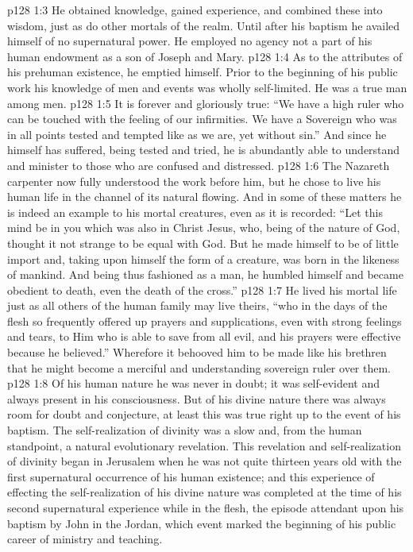 \vs p128 1:3 He obtained knowledge, gained experience, and combined these into wisdom, just as do other mortals of the realm. Until after his baptism he availed himself of no supernatural power. He employed no agency not a part of his human endowment as a son of Joseph and Mary.
\vs p128 1:4 As to the attributes of his prehuman existence, he emptied himself. Prior to the beginning of his public work his knowledge of men and events was wholly self\hyp{}limited. He was a true man among men.
\pc \vs p128 1:5 It is forever and gloriously true: “We have a high ruler who can be touched with the feeling of our infirmities. We have a Sovereign who was in all points tested and tempted like as we are, yet without sin.” And since he himself has suffered, being tested and tried, he is abundantly able to understand and minister to those who are confused and distressed.
\pc \vs p128 1:6 The Nazareth carpenter now fully understood the work before him, but he chose to live his human life in the channel of its natural flowing. And in some of these matters he is indeed an example to his mortal creatures, even as it is recorded: “Let this mind be in you which was also in Christ Jesus, who, being of the nature of God, thought it not strange to be equal with God. But he made himself to be of little import and, taking upon himself the form of a creature, was born in the likeness of mankind. And being thus fashioned as a man, he humbled himself and became obedient to death, even the death of the cross.”
\vs p128 1:7 He lived his mortal life just as all others of the human family may live theirs, “who in the days of the flesh so frequently offered up prayers and supplications, even with strong feelings and tears, to Him who is able to save from all evil, and his prayers were effective because he believed.” Wherefore it behooved him  to be made like his brethren that he might become a merciful and understanding sovereign ruler over them.
\vs p128 1:8 Of his human nature he was never in doubt; it was self\hyp{}evident and always present in his consciousness. But of his divine nature there was always room for doubt and conjecture, at least this was true right up to the event of his baptism. The self\hyp{}realization of divinity was a slow and, from the human standpoint, a natural evolutionary revelation. This revelation and self\hyp{}realization of divinity began in Jerusalem when he was not quite thirteen years old with the first supernatural occurrence of his human existence; and this experience of effecting the self\hyp{}realization of his divine nature was completed at the time of his second supernatural experience while in the flesh, the episode attendant upon his baptism by John in the Jordan, which event marked the beginning of his public career of ministry and teaching.

